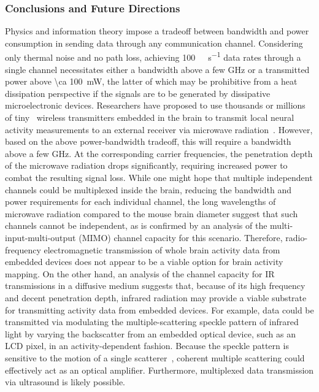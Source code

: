 \subsubsection{Conclusions and Future Directions}

Physics and information theory impose a tradeoff between bandwidth and power consumption in sending data through any communication channel.
Considering only thermal noise and no path loss, achieving \SI{100}{\giga\bit\per\second} data rates through a single channel necessitates either a bandwidth above a few \si{\giga\hertz} or a transmitted power above \SI{\ca 100}{\milli\watt}, the latter of which may be prohibitive from a heat dissipation perspective if the signals are to be generated by dissipative microelectronic devices.
Researchers have proposed to use thousands or millions of tiny~\cite{gomez10} wireless transmitters embedded in the brain to transmit local neural activity measurements to an external receiver via microwave radiation~\cite{dyson09}.
However, based on the above power-bandwidth tradeoff, this will require a bandwidth above a few \si{\giga\hertz}.
At the corresponding carrier frequencies, the penetration depth of the microwave radiation drops significantly, requiring increased power to combat the resulting signal loss.
While one might hope that multiple independent channels could be multiplexed inside the brain, reducing the bandwidth and power requirements for each individual channel, the long wavelengths of microwave radiation compared to the mouse brain diameter suggest that such channels cannot be independent, as is confirmed by an analysis of the multi-input-multi-output (MIMO) channel capacity for this scenario.
Therefore, radio-frequency electromagnetic transmission of whole brain activity data from embedded devices does not appear to be a viable option for brain activity mapping.
On the other hand, an analysis of the channel capacity for IR transmissions in a diffusive medium suggests that, because of its high frequency and decent penetration depth, infrared radiation may provide a viable substrate for transmitting activity data from embedded devices.
For example, data could be transmitted via modulating the multiple-scattering speckle pattern of infrared light by varying the backscatter from an embedded optical device, such as an LCD pixel, in an activity-dependent fashion.
Because the speckle pattern is sensitive to the motion of a single scatterer~\cite{berkovits91}, coherent multiple scattering could effectively act as an optical amplifier. Furthermore, multiplexed data transmission via ultrasound is likely possible.

